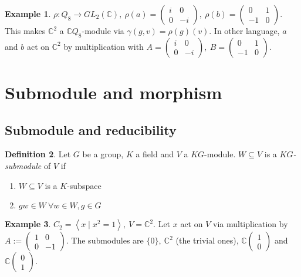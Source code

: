 \documentclass{article}
\newcommand{\la}{\left\langle}
\newcommand{\ra}{\right\rangle}
\newcommand{\C}{\mathbb{C}}
\theoremstyle{definition}
\newtheorem{defn}{Definition}[subsection]
\newtheorem{example}[defn]{Example}
\begin{document}
\begin{example}
$\rho:Q_8\rightarrow GL_2(\C),\ \rho(a)=\begin{pmatrix}i&0\\0&-i\end{pmatrix},\ \rho(b)=\begin{pmatrix}0&1\\-1&0\end{pmatrix}$. This makes $\C^2$ a $\C Q_8$-module via $\gamma(g,v)=\rho(g)(v)$. In other language, $a$ and $b$ act on $\C^2$ by multiplication with $A=\begin{pmatrix}i&0\\0&-i\end{pmatrix},\ B=\begin{pmatrix}0&1\\-1&0\end{pmatrix}$.
\end{example}

\section{Submodule and morphism}
\subsection{Submodule and reducibility}
\begin{defn}
Let $G$ be a group, $K$ a field and $V$ a $KG$-module. $W\subseteq V$ is a $KG$\textit{-submodule} of $V$ if
\begin{enumerate}
\item $W\subseteq V$ is a $K$-subspace
\item $gw\in W \ \forall w\in W, g\in G$
\end{enumerate}
\end{defn}

\begin{example}
$C_2=\la x\mid x^2=1\ra,\ V=\C^2$. Let $x$ act on $V$ via multiplication by $A:=\begin{pmatrix}1&0\\0&-1\end{pmatrix}$. The submodules are $\{0\},\ \C^2$ (the trivial ones), $\C\begin{pmatrix}1\\0\end{pmatrix}$ and  $\C\begin{pmatrix}0\\1\end{pmatrix}$.
\end{example}
\end{document}
